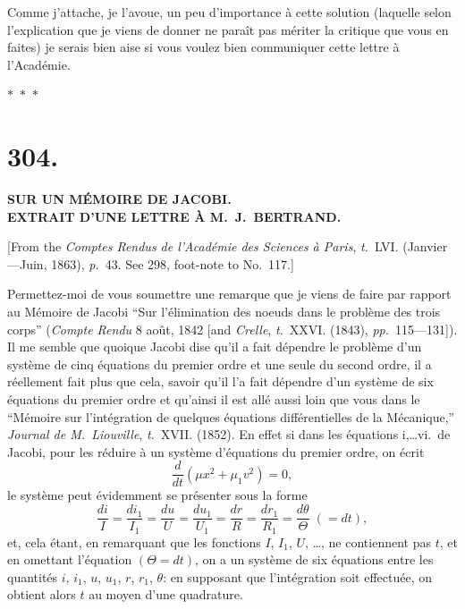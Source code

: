 \documentclass[11pt,a4paper]{article}
\newcommand{\tome}{\textit{t.}}
\newcommand{\page}{\textit{p.}}
\newcommand{\pages}{\textit{pp.}}
\newcommand{\asterism}{\par\begin{center}$\ast$~$\ast$~$\ast$\end{center}\par}
\begin{document}
Comme j'attache, je l'avoue, un peu d'importance \`{a} cette solution (laquelle selon l'explication que je viens de donner ne para\^{i}t pas m\'{e}riter la critique que vous en faites) je serais bien aise si vous voulez bien communiquer cette lettre \`{a} l'Acad\'{e}mie.

\asterism

\clearpage

\section*{304.}

\begin{center}
\textbf{SUR UN M\'{E}MOIRE DE JACOBI.}\\[0.5em]
\textbf{EXTRAIT D'UNE LETTRE \`{A} M.~J.~BERTRAND.}
\end{center}

[From the \textit{Comptes Rendus de l'Acad\'{e}mie des Sciences \`{a} Paris}, \tome~LVI. (Janvier---Juin, 1863), \page~43. See 298, foot-note to No.~117.]

\medskip

Permettez-moi de vous soumettre une remarque que je viens de faire par rapport au M\'{e}moire de Jacobi ``Sur l'\'{e}limination des noeuds dans le probl\`{e}me des trois corps'' (\textit{Compte Rendu} 8 ao\^{u}t, 1842 [and \textit{Crelle}, \tome~XXVI. (1843), \pages~115---131]). Il me semble que quoique Jacobi dise qu'il a fait d\'{e}pendre le probl\`{e}me d'un syst\`{e}me de cinq \'{e}quations du premier ordre et une seule du second ordre, il a r\'{e}ellement fait plus que cela, savoir qu'il l'a fait d\'{e}pendre d'un syst\`{e}me de six \'{e}quations du premier ordre et qu'ainsi il est all\'{e} aussi loin que vous dans le ``M\'{e}moire sur l'int\'{e}gration de quelques \'{e}quations diff\'{e}rentielles de la M\'{e}canique,'' \textit{Journal de M.~Liouville}, \tome~XVII. (1852). En effet si dans les \'{e}quations i,\ldots vi.\ de Jacobi, pour les r\'{e}duire \`{a} un syst\`{e}me d'\'{e}quations du premier ordre, on \'{e}crit
\[
\frac{d}{dt}(\mu x^2 + \mu_1 v^2) = 0,
\]
le syst\`{e}me peut \'{e}videmment se pr\'{e}senter sous la forme
\[
\frac{di}{I} = \frac{di_1}{I_1} = \frac{du}{U} = \frac{du_1}{U_1} = \frac{dr}{R} = \frac{dr_1}{R_1} = \frac{d\theta}{\Theta} \; (= dt),
\]
et, cela \'{e}tant, en remarquant que les fonctions $I$, $I_1$, $U$, \ldots, ne contiennent pas $t$, et en omettant l'\'{e}quation $(\Theta = dt)$, on a un syst\`{e}me de six \'{e}quations entre les quantit\'{e}s $i$, $i_1$, $u$, $u_1$, $r$, $r_1$, $\theta$: en supposant que l'int\'{e}gration soit effectu\'{e}e, on obtient alors $t$ au moyen d'une quadrature.
\end{document}
